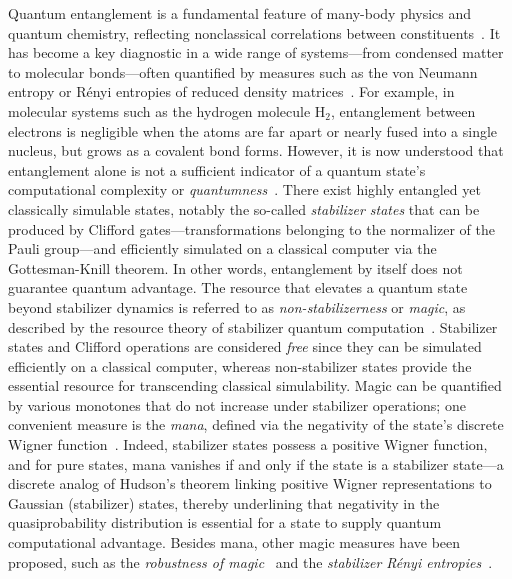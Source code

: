 \documentclass[aps,prl,twocolumn,groupedaddress, reprint,floatfix,nofootinbib,longbibliography]{revtex4-2}
\begin{document}
    Quantum entanglement is a fundamental feature of many-body physics and quantum chemistry, reflecting nonclassical correlations between constituents \cite{rissler2006measuring,boguslawski2015orbital,ding2025entanglement}. It has become a key diagnostic in a wide range of systems—from condensed matter to molecular bonds—often quantified by measures such as the von Neumann entropy or Rényi entropies of reduced density matrices \cite{szalay2017correlation}. For example, in molecular systems such as the hydrogen molecule H$_2$, entanglement between electrons is negligible when the atoms are far apart or nearly fused into a single nucleus, but grows as a covalent bond forms. However, it is now understood that entanglement alone is not a sufficient indicator of a quantum state’s computational complexity or \textit{quantumness} \cite{bravyi2005universal,howard2014contextuality}. There exist highly entangled yet classically simulable states, notably the so-called \textit{stabilizer states} that can be produced by Clifford gates—transformations belonging to the normalizer of the Pauli group—and efficiently simulated on a classical computer via the Gottesman-Knill theorem. In other words, entanglement by itself does not guarantee quantum advantage. The resource that elevates a quantum state beyond stabilizer dynamics is referred to as \textit{non-stabilizerness} or \textit{magic}, as described by the resource theory of stabilizer quantum computation \cite{howard2014contextuality}. Stabilizer states and Clifford operations are considered \textit{free} since they can be simulated efficiently on a classical computer, whereas non-stabilizer states provide the essential resource for transcending classical simulability. Magic can be quantified by various monotones that do not increase under stabilizer operations; one convenient measure is the \textit{mana}, defined via the negativity of the state’s discrete Wigner function \cite{howard2014contextuality}. Indeed, stabilizer states possess a positive Wigner function, and for pure states, mana vanishes if and only if the state is a stabilizer state—a discrete analog of Hudson’s theorem linking positive Wigner representations to Gaussian (stabilizer) states, thereby underlining that negativity in the quasiprobability distribution is essential for a state to supply quantum computational advantage. Besides mana, other magic measures have been proposed, such as the \textit{robustness of magic} \cite{howard2017application,heinrich2019robustness,hamaguchi2024handbook} and the \textit{stabilizer Rényi entropies} \cite{leone2022stabilizer}.
\end{document}
